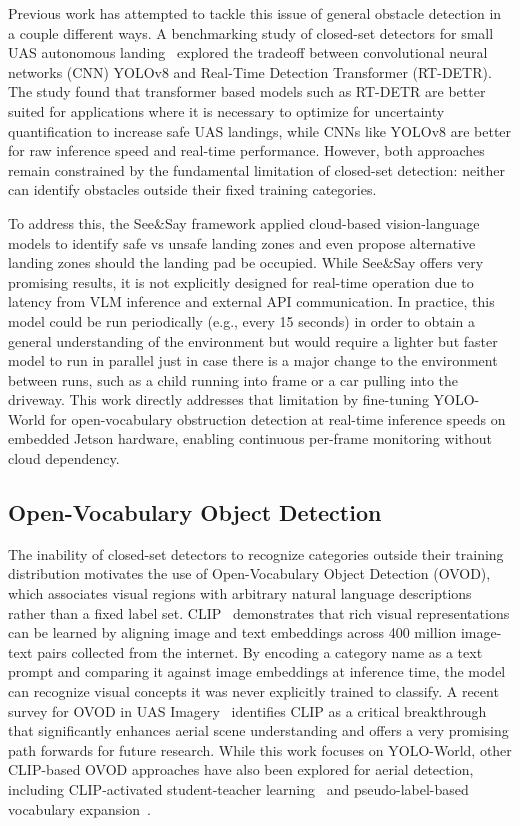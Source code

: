 \documentclass[conf]{new-aiaa}
\begin{document}
Previous work has attempted to tackle this issue of general obstacle detection in a couple different ways. A benchmarking study of closed-set detectors for small UAS autonomous landing~\cite{vu2025transformer} explored the tradeoff between convolutional neural networks (CNN) YOLOv8 and Real-Time Detection Transformer (RT-DETR). The study found that transformer based models such as RT-DETR are better suited for applications where it is necessary to optimize for uncertainty quantification to increase safe UAS landings, while CNNs like YOLOv8 are better for raw inference speed and real-time performance. However, both approaches remain constrained by the fundamental limitation of closed-set detection: neither can identify obstacles outside their fixed training categories.

To address this, the See\&Say \cite{ghazanfari2026seesay} framework applied cloud-based vision-language models to identify safe vs unsafe landing zones and even propose alternative landing zones should the landing pad be occupied. While See\&Say offers very promising results, it is not explicitly designed for real-time operation due to latency from VLM inference and external API communication. In practice, this model could be run periodically (e.g., every 15 seconds) in order to obtain a general understanding of the environment but would require a lighter but faster model to run in parallel just in case there is a major change to the environment between runs, such as a child running into frame or a car pulling into the driveway. This work directly addresses that limitation by fine-tuning YOLO-World for open-vocabulary obstruction detection at real-time inference speeds on embedded Jetson hardware, enabling continuous per-frame monitoring without cloud dependency.


\subsection{Open-Vocabulary Object Detection}

The inability of closed-set detectors to recognize categories 
outside their training distribution motivates the use of 
Open-Vocabulary Object Detection (OVOD), which associates visual 
regions with arbitrary natural language descriptions rather 
than a fixed label set. CLIP~\cite{radford2021learning} 
demonstrates that rich visual representations can be learned 
by aligning image and text embeddings across 400 million 
image-text pairs collected from the internet. By encoding a 
category name as a text prompt and comparing it against image 
embeddings at inference time, the model can recognize visual 
concepts it was never explicitly trained to classify. A recent survey for OVOD in UAS Imagery~\cite{zhou2025ovuavsurvey} identifies {CLIP} as a critical breakthrough that significantly enhances aerial scene understanding and offers a very promising path forwards for future research. While this work focuses on {YOLO-World}, other {CLIP}-based {OVOD} approaches have also been explored 
for aerial detection, including {CLIP}-activated student-teacher learning~\cite{li2024clipaerial} and pseudo-label-based vocabulary expansion~\cite{li2024castdet}.
\end{document}
